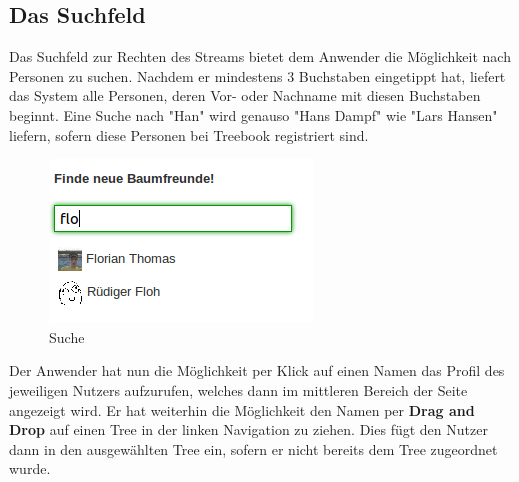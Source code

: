 \documentclass[10pt,a4paper]{book}
\makeatletter
\def\ScaleIfNeeded{%
\ifdim\Gin@nat@width>\linewidth
\linewidth
\else
\Gin@nat@width
\fi
}
\makeatother
\begin{document}
\subsection{Das Suchfeld}
Das Suchfeld zur Rechten des Streams bietet dem Anwender die Möglichkeit nach Personen zu suchen. Nachdem er mindestens 3 Buchstaben eingetippt hat, liefert das System alle Personen, deren Vor- oder Nachname mit diesen Buchstaben beginnt. Eine Suche nach "Han" wird genauso "Hans Dampf" wie "Lars Hansen" liefern, sofern diese Personen bei Treebook registriert sind.
\begin{figure}[htbp]
\centering
\includegraphics[width=\ScaleIfNeeded]{Pictures/screen_search.png}%
\caption{Suche}%
\end{figure}
Der Anwender hat nun die Möglichkeit per Klick auf einen Namen das Profil des jeweiligen Nutzers aufzurufen, welches dann im mittleren Bereich der Seite angezeigt wird.
Er hat weiterhin die Möglichkeit den Namen per \textbf{Drag and Drop} auf einen Tree in der linken Navigation zu ziehen. Dies fügt den Nutzer dann in den ausgewählten Tree ein, sofern er nicht bereits dem Tree zugeordnet wurde.
\end{document}
